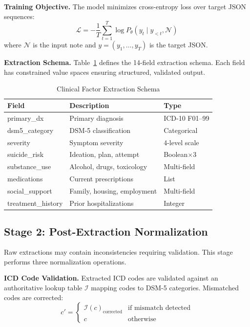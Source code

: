 \documentclass[conference]{IEEEtran}
\begin{document}
\textbf{Training Objective.} The model minimizes cross-entropy loss over target JSON sequences:
\begin{equation}
    \mathcal{L} = -\frac{1}{T} \sum_{t=1}^{T} \log P_\theta(y_t \mid y_{<t}, \mathcal{N})
\end{equation}
where $\mathcal{N}$ is the input note and $y = (y_1, \ldots, y_T)$ is the target JSON.

\textbf{Extraction Schema.} Table~\ref{tab:schema} defines the 14-field extraction schema. Each field has constrained value spaces ensuring structured, validated output.

\begin{table}[h]
\caption{Clinical Factor Extraction Schema}
\label{tab:schema}
\centering
\small
\begin{tabular}{@{}p{2.0cm}p{3.8cm}p{1.6cm}@{}}
\toprule
\textbf{Field} & \textbf{Description} & \textbf{Type} \\
\midrule
primary\_dx & Primary diagnosis & ICD-10 F01--99 \\
dsm5\_category & DSM-5 classification & Categorical \\
severity & Symptom severity & 4-level scale \\
suicide\_risk & Ideation, plan, attempt & Boolean$\times$3 \\
substance\_use & Alcohol, drugs, toxicology & Multi-field \\
medications & Current prescriptions & List \\
social\_support & Family, housing, employment & Multi-field \\
treatment\_history & Prior hospitalizations & Integer \\
\bottomrule
\end{tabular}
\end{table}

\subsection{Stage 2: Post-Extraction Normalization}

Raw extractions may contain inconsistencies requiring validation. This stage performs three normalization operations.

\textbf{ICD Code Validation.} Extracted ICD codes are validated against an authoritative lookup table $\mathcal{I}$ mapping codes to DSM-5 categories. Mismatched codes are corrected:
\begin{equation}
    c' = \begin{cases}
        \mathcal{I}(c)_{\text{corrected}} & \text{if mismatch detected} \\
        c & \text{otherwise}
    \end{cases}
\end{equation}
\end{document}
